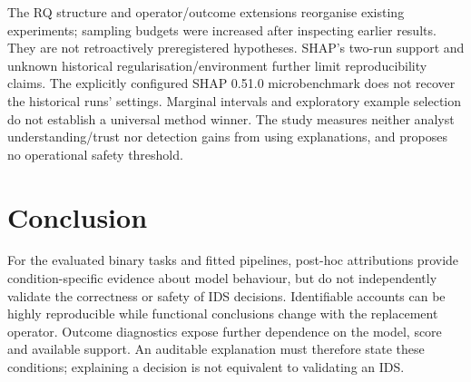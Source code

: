 The RQ structure and operator/outcome extensions reorganise existing
experiments; sampling budgets were increased after inspecting earlier
results. They are not retroactively preregistered hypotheses. SHAP's two-run
support and unknown historical regularisation/environment further limit
reproducibility claims. The explicitly configured SHAP 0.51.0 microbenchmark
does not recover the historical runs' settings. Marginal intervals and
exploratory example selection do not establish a universal method winner.
The study measures neither analyst understanding/trust nor detection gains
from using explanations, and proposes no operational safety threshold.

\section{Conclusion}

For the evaluated binary tasks and fitted pipelines, post-hoc attributions
provide condition-specific evidence about model behaviour, but do not
independently validate the correctness or safety of IDS decisions.
Identifiable accounts can be highly reproducible while
functional conclusions change with the replacement operator. Outcome diagnostics
expose further dependence on the model, score and available support. An
auditable explanation must therefore state these conditions; explaining a
decision is not equivalent to validating an IDS.
